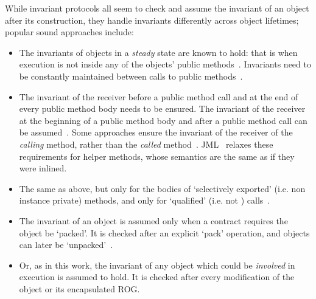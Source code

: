 While invariant protocols all seem to 
check and assume the invariant of an object after its construction, they handle invariants differently across object lifetimes; popular sound approaches include:
\begin{itemize}
\item The invariants of objects in a \textit{steady} state are known to hold: that is when execution is not inside any of the objects' public methods~\cite{Gopinathan:2008:RMO:1483018.1483028}. Invariants need to be constantly maintained between calls to public methods~\cite{WikiInvariant}.
\item 
The invariant of the receiver before a public method call and at the end of every public method body needs to be ensured. The invariant of the receiver at the beginning of a public method body and after a public method call can be assumed~\cite{Burdy2005,drossopoulou2008unified}.  
Some approaches ensure the invariant of the receiver of the \emph{calling} method, rather than the \emph{called} method~\cite{DBLP:journals/scp/MullerPL06}.
JML~\cite{JML} relaxes these requirements for helper methods, whose semantics are the same as if they were inlined.


\item The same as above, but only for the bodies of `selectively exported' (i.e. non instance private) methods, and only for `qualified' (i.e. not \Q@this@) calls~\cite{meyer2016class}.
\item The invariant of an object is assumed only when a contract requires the object be `packed'. It is checked after an explicit `pack' operation, and objects can later be `unpacked'~\cite{DBLP:journals/jot/BarnettDFLS04}.
\item Or, as in this work, the invariant of any object which could be \emph{involved} in execution is assumed to hold. It is checked after every modification of the object or its encapsulated ROG.
\end{itemize}
